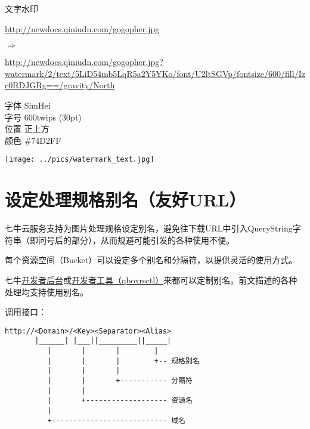 \documentclass[11pt, oneside]{book}
\newcommand{\qsym}[1]{
\footnotesize
\noindent
#1\par
\normalsize
}
\newcommand{\qpara}[1]{
\vspace{0.3em}
\noindent
#1\par
\vspace{0.3em}
}
\newcommand{\qsamplelink}[1]{
\vspace{0.2em}
\noindent
#1\par
\vspace{0.1em}
}
\newcommand{\qurl}[1]{\footnotesize\url{#1}\normalsize}
\begin{document}
\begin{sample}
  \caption{文字水印}
    \qsamplelink{\qurl{http://newdocs.qiniudn.com/gogopher.jpg}}
    \qsym{$\Rightarrow$}
    \qurl{http://newdocs.qiniudn.com/gogopher.jpg?watermark/2/text/5LiD54mb5LqR5a2Y5YKo/font/U2ltSGVp/fontsize/600/fill/Izc0RDJGRg==/gravity/North}
    \linebreak

\footnotesize
\qpara{字体 SimHei \\ 字号 600twips (30pt) \\ 位置 正上方 \\ 颜色 \#74D2FF}
\normalsize

    \begin{center}
      \texttt{[image: ../pics/watermark\_text.jpg]}
    \end{center}
\end{sample}

\clearpage

\section{设定处理规格别名（友好URL）}

\qpara{七牛云服务支持为图片处理规格设定别名，避免往下载URL中引入QueryString字符串（即问号后的部分），从而规避可能引发的各种使用不便。}
\qpara{每个资源空间（Bucket）可以设定多个别名和分隔符，以提供灵活的使用方式。}
\qpara{七牛\href{https://portal.qiniu.com}{开发者后台}或\href{http://docs.qiniu.com/tools/v6/qboxrsctl.html}{开发者工具（qboxrsctl）}来都可以定制别名。前文描述的各种处理均支持使用别名。}

\qpara{调用接口：}
\begin{lstlisting}
http://<Domain>/<Key><Separator><Alias>
       |______| |___||_________||_____|
          |       |       |        |
          |       |       |        +-- 规格别名
          |       |       |
          |       |       +----------- 分隔符
          |       |
          |       +------------------- 资源名
          |
          +--------------------------- 域名
\end{lstlisting}
\end{document}
